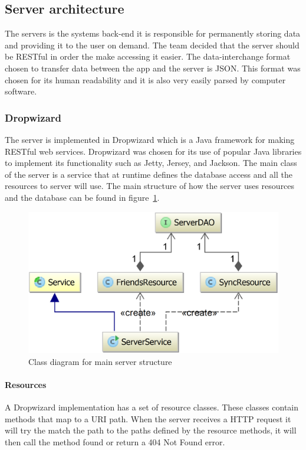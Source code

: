 \label{sec:arch_server}
\subsection{Server architecture}
The servers is the systems back-end it is responsible for permanently storing data and providing it to the user on demand. The team decided that the server should be RESTful in order the make accessing it easier. The data-interchange format chosen to transfer data between the app and the server is JSON. This format was chosen for its human readability and it is also very easily parsed by computer software.

\subsubsection{Dropwizard}
The server is implemented in Dropwizard which is a Java framework for making RESTful web services. Dropwizard was chosen for its use of popular Java libraries to implement its functionality such as Jetty, Jersey, and Jackson. The main class of the server is a service that at runtime defines the database access and all the resources to server will use. The main structure of how the server uses resources and the database can be found in figure~\ref{fig:classDiagramServer}.

\begin{figure}[H]
\includegraphics[width=\textwidth]{ch/architecture/fig/classDiagramServer.png}
\caption{Class diagram for main server structure}
\label{fig:classDiagramServer}
\end{figure}

\paragraph{Resources}
A Dropwizard implementation has a set of resource classes. These classes contain methods that map to a URI path. When the server receives a HTTP request it will try the match the path to the paths defined by the resource methods, it will then call the method found or return a 404 Not Found error.

